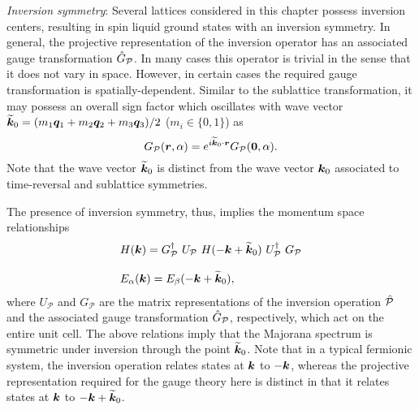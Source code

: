 \textit{Inversion symmetry}:
Several lattices considered in this chapter possess inversion centers, resulting in spin liquid ground states with an inversion symmetry.
In general, the projective representation of the inversion operator has an associated gauge transformation $\hat{G}_{\mathcal{P}}$.
In many cases this operator is trivial in the sense that it does not vary in space.
However, in certain cases the required gauge transformation is spatially-dependent.
Similar to the sublattice transformation, it may possess an overall sign factor which oscillates with wave vector $\widetilde{\bm{k}}_0 = (m_1 \bm{q}_1 + m_2 \bm{q}_2 + m_3 \bm{q}_3)/2$ ($m_i \in \{0, 1\}$) as
%
\begin{equation}
	G_{\mathcal{P}}(\bm{r}, \alpha) = e^{i \widetilde{\bm{k}}_0 \cdot \bm{r}} G_{\mathcal{P}} (\bm{0}, \alpha).
\end{equation}
%
Note that the wave vector $\widetilde{\bm{k}}_0$ is distinct from the wave vector $\bm{k}_0$ associated to time-reversal and sublattice symmetries.

The presence of inversion symmetry, thus, implies the momentum space relationships
%
\begin{equation}
	\begin{matrix*}[l]
		H(\bk) = G\dag_{\mathcal{P}}~U_{\mathcal{P}}~H(-\bk + \til{\bk}_0)~U\dag_{\mathcal{P}}~G_{\mathcal{P}} \\
		\\
		E_{\alpha}(\bk) = E_{\beta}(-\bk + \til{\bk}_0),
	\end{matrix*}
\end{equation}
%
where $U_{\mathcal{P}}$ and $G_{\mathcal{P}}$ are the matrix representations of the inversion operation $\hat{\mathcal{P}}$ and the associated gauge transformation $\hat{G}_{\mathcal{P}}$, respectively, which act on the entire unit cell.
The above relations imply that the Majorana spectrum is symmetric under inversion through the point $\widetilde{\bm{k}}_0$.
Note that in a typical fermionic system, the inversion operation relates states at $\bm{k}$ to $-\bm{k}$, whereas the projective representation required for the gauge theory here is distinct in that it relates states at $\bm{k}$ to $-\bm{k} + \widetilde{\bm{k}}_0$.


